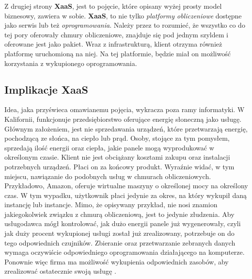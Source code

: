 Z drugiej strony \textbf{XaaS}, jest to pojęcie, które
opisany wyżej prosty model biznesowy, zawiera w sobie. \textbf{XaaS}, to nie tylko \textit{platformy obliczeniowe} dostępne jako serwis lub też \textit{oprogramowania}.
Należy przez to rozumieć, że wszystko co do tej pory oferowały chmury obliczeniowe, znajduje się pod jednym szyldem i oferowane jest jako pakiet. 
Wraz z infrastrukturą, klient otrzyma również platformę uruchomioną na niej. Na tej platformie, będzie miał on możliwość korzystania z wykupionego oprogramowania.

\subsection{Implikacje XaaS}
Idea, jaka przyświeca omawianemu pojęcia, wykracza poza ramy informatyki. W Kalifornii, funkcjonuje
przedsiębiorstwo oferujące energię słoneczną jako usługę. Głównym założeniem, jest nie sprzedawania
urządzeń, które przetwarzają energię, pochodzącą ze słońca, na ciepło lub prąd. Osoby, stojące za tym pomysłem, sprzedają ilość energii oraz ciepła, jakie 
panele mogą wyprodukować w określonym czasie. Klient nie jest obciążany kosztami zakupu oraz instalacji
potrzebnych urządzeń. Płaci on za końcowy produkt. Wyraźnie widać, w tym miejscu, nawiązanie do 
podobnych usług w chmurach obliczeniowych. Przykładowo, Amazon, oferuje wirtualne maszyny o określonej mocy na określony czas. W tym wypadku, 
użytkownik płaci jedynie za okres, na który wykupił daną instancję lub instancje. Mimo, że opisywany przykład,
nie nosi znamion jakiegokolwiek związku z chmurą obliczeniową, jest to jedynie złudzenia. Aby usługodawca mógł kontrolować, jak dużo energii panele
już wygenerowały, czyli jak duży procent wykupionej usługi został już zrealizowany, potrzebuje on do tego odpowiednich czujników. Zbieranie oraz
przetwarzanie zebranych danych wymaga oczywiście odpowiedniego oprogramowania działającego na komputerze. Ponownie więc firma ma możliwość
wykupienia odpowiednich zasobów, aby zrealizować ostatecznie swoją usługę \cite{linkedin_anything_as_a_service}. 